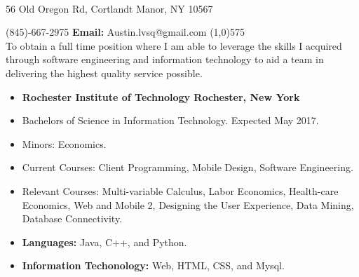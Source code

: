 \documentclass[10pt]{article}
\begin{document}
\begin{center}
\\
\vspace{.3ex}
56 Old Oregon Rd, Cortlandt Manor, NY 10567
\end{center}
 (845)-667-2975 \hfill {\bf Email:} Austin.lvsq@gmail.com
\line(1,0){575}\\

To obtain a full time position where I am able to leverage the skills I acquired through software engineering and information technology to aid a team in delivering the highest quality service possible.
\vspace{.75ex}\\
\begin{itemize}[topsep=1ex, itemsep=.25ex, partopsep=0ex, parsep=0ex]
	\item[]{{\bf Rochester Institute of Technology \hfill Rochester, New York}}
  \item[] Bachelors of Science in Information Technology. \hfill Expected May 2017.
  \item[] Minors: Economics.
  
  \item[] {Current Courses:} Client Programming, Mobile Design, Software Engineering.
  \item[] {Relevant Courses:} Multi-variable Calculus, Labor Economics, Health-care Economics, Web and Mobile 2, Designing the User Experience, Data Mining, Database Connectivity.
\end{itemize}
\vspace{1ex}
\begin{itemize} [topsep=1ex, itemsep=.25ex, partopsep=0ex, parsep=0ex]
	\item[] {\bf Languages:} Java, C++, and Python.
 	\item[] {\bf Information Techonology:} Web, HTML, CSS, and Mysql.
\end{itemize}
\vspace{.75ex}
\end{document}
